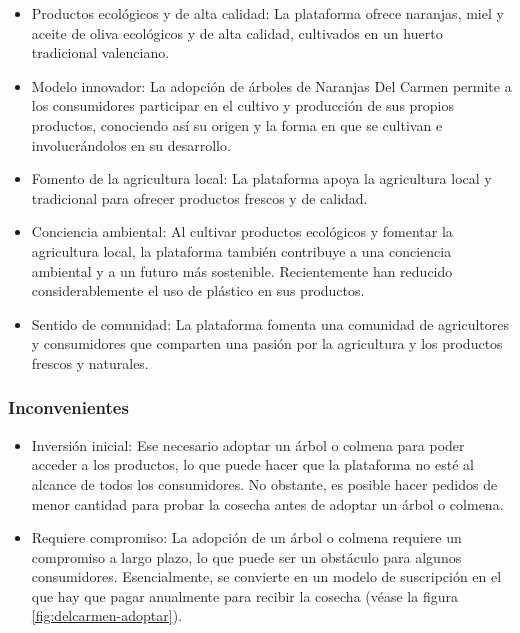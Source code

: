 \begin{itemize}

	\item Productos ecológicos y de alta calidad: La plataforma ofrece naranjas, miel y aceite de oliva ecológicos y de alta calidad, cultivados en un huerto tradicional valenciano.

	\item Modelo innovador: La adopción de árboles de Naranjas Del Carmen permite a los consumidores participar en el cultivo y producción de sus propios productos, conociendo así su origen y la forma en que se cultivan e involucrándolos en su desarrollo.

	\item Fomento de la agricultura local: La plataforma apoya la agricultura local y tradicional para ofrecer productos frescos y de calidad.

	\item Conciencia ambiental: Al cultivar productos ecológicos y fomentar la agricultura local, la plataforma también contribuye a una conciencia ambiental y a un futuro más sostenible. Recientemente han reducido considerablemente el uso de plástico en sus productos.

	\item Sentido de comunidad: La plataforma fomenta una comunidad de agricultores y consumidores que comparten una pasión por la agricultura y los productos frescos y naturales.

\end{itemize}

\subsubsection{Inconvenientes}

\begin{itemize}

	\item Inversión inicial: Ese necesario adoptar un árbol o colmena para poder acceder a los productos, lo que puede hacer que la plataforma no esté al alcance de todos los consumidores. No obstante, es posible hacer pedidos de menor cantidad para probar la cosecha antes de adoptar un árbol o colmena.

	\item Requiere compromiso: La adopción de un árbol o colmena requiere un compromiso a largo plazo, lo que puede ser un obstáculo para algunos consumidores. Esencialmente, se convierte en un modelo de suscripción en el que hay que pagar anualmente para recibir la cosecha (véase la figura \ref{fig:delcarmen-adoptar}).

\end{itemize}


